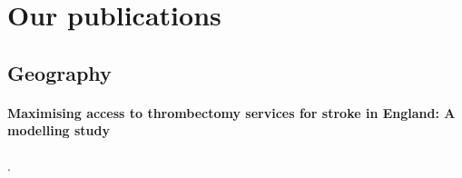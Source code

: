 \section{Our publications}

\subsection{Geography}

\paragraph{Maximising access to thrombectomy services for stroke in England: A modelling study} \cite{allen_maximising_2019}.

